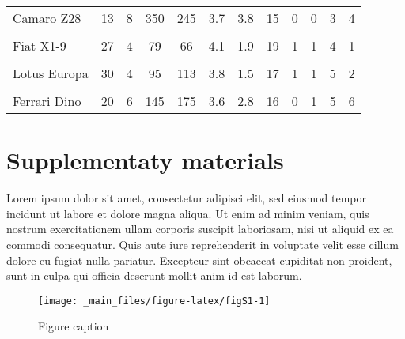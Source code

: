 \documentclass[
  12pt,
]{article}
\begin{document}
\begin{longtable}[t]{lccccccccccc}
Camaro Z28 & 13 & 8 & 350 & 245 & 3.7 & 3.8 & 15 & 0 & 0 & 3 & 4\\
\cellcolor{gray!6}{Pontiac Firebird} & \cellcolor{gray!6}{19} & \cellcolor{gray!6}{8} & \cellcolor{gray!6}{400} & \cellcolor{gray!6}{175} & \cellcolor{gray!6}{3.1} & \cellcolor{gray!6}{3.8} & \cellcolor{gray!6}{17} & \cellcolor{gray!6}{0} & \cellcolor{gray!6}{0} & \cellcolor{gray!6}{3} & \cellcolor{gray!6}{2}\\
\addlinespace
Fiat X1-9 & 27 & 4 & 79 & 66 & 4.1 & 1.9 & 19 & 1 & 1 & 4 & 1\\
\cellcolor{gray!6}{Porsche 914-2} & \cellcolor{gray!6}{26} & \cellcolor{gray!6}{4} & \cellcolor{gray!6}{120} & \cellcolor{gray!6}{91} & \cellcolor{gray!6}{4.4} & \cellcolor{gray!6}{2.1} & \cellcolor{gray!6}{17} & \cellcolor{gray!6}{0} & \cellcolor{gray!6}{1} & \cellcolor{gray!6}{5} & \cellcolor{gray!6}{2}\\
Lotus Europa & 30 & 4 & 95 & 113 & 3.8 & 1.5 & 17 & 1 & 1 & 5 & 2\\
\cellcolor{gray!6}{Ford Pantera L} & \cellcolor{gray!6}{16} & \cellcolor{gray!6}{8} & \cellcolor{gray!6}{351} & \cellcolor{gray!6}{264} & \cellcolor{gray!6}{4.2} & \cellcolor{gray!6}{3.2} & \cellcolor{gray!6}{14} & \cellcolor{gray!6}{0} & \cellcolor{gray!6}{1} & \cellcolor{gray!6}{5} & \cellcolor{gray!6}{4}\\
Ferrari Dino & 20 & 6 & 145 & 175 & 3.6 & 2.8 & 16 & 0 & 1 & 5 & 6\\*
\end{longtable}
\endgroup{}

\pagebreak

\hypertarget{supplementaty-materials}{%
\section*{Supplementaty materials}\label{supplementaty-materials}}

\renewcommand{\thefigure}{S\arabic{figure}}
\setcounter{figure}{0}
\renewcommand{\thetable}{S\arabic{table}}
\setcounter{table}{0}
\renewcommand{\theequation}{S\arabic{equation}}
\setcounter{equation}{0}

Lorem ipsum dolor sit amet, consectetur adipisci elit, sed eiusmod tempor incidunt ut labore et dolore magna aliqua. Ut enim ad minim veniam, quis nostrum exercitationem ullam corporis suscipit laboriosam, nisi ut aliquid ex ea commodi consequatur. Quis aute iure reprehenderit in voluptate velit esse cillum dolore eu fugiat nulla pariatur. Excepteur sint obcaecat cupiditat non proident, sunt in culpa qui officia deserunt mollit anim id est laborum.

\begin{figure}[H]

{\centering \texttt{[image: \_main\_files/figure-latex/figS1-1]} 

}

\caption{Figure caption}\label{fig:figS1}
\end{figure}
\end{document}
